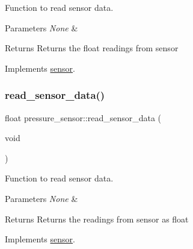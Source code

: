 Function to read sensor data. 


\begin{DoxyParams}{Parameters}
{\em None} & \\
\hline
\end{DoxyParams}
\begin{DoxyReturn}{Returns}
Returns the float readings from sensor 
\end{DoxyReturn}


Implements \hyperlink{classsensor_a682adbfb20854e2bce40b8a5c0aa6232}{sensor}.

\mbox{\label{group___ventilator_module_ga06b5da2de0abf739405ca3c48aa0119c}} 
\subsubsection{\texorpdfstring{read\+\_\+sensor\+\_\+data()}{read\_sensor\_data()}\hspace{0.1cm}{\footnotesize\ttfamily [2/3]}}
{\footnotesize\ttfamily float pressure\+\_\+sensor\+::read\+\_\+sensor\+\_\+data (\begin{DoxyParamCaption}\item[{void}]{ }\end{DoxyParamCaption})\hspace{0.3cm}{\ttfamily [virtual]}}



Function to read sensor data. 


\begin{DoxyParams}{Parameters}
{\em None} & \\
\hline
\end{DoxyParams}
\begin{DoxyReturn}{Returns}
Returns the readings from sensor as float 
\end{DoxyReturn}


Implements \hyperlink{classsensor_a682adbfb20854e2bce40b8a5c0aa6232}{sensor}.

\mbox{\label{group___ventilator_module_ga35a8f7056ae3545cbb3a69e993147fb3}} 
